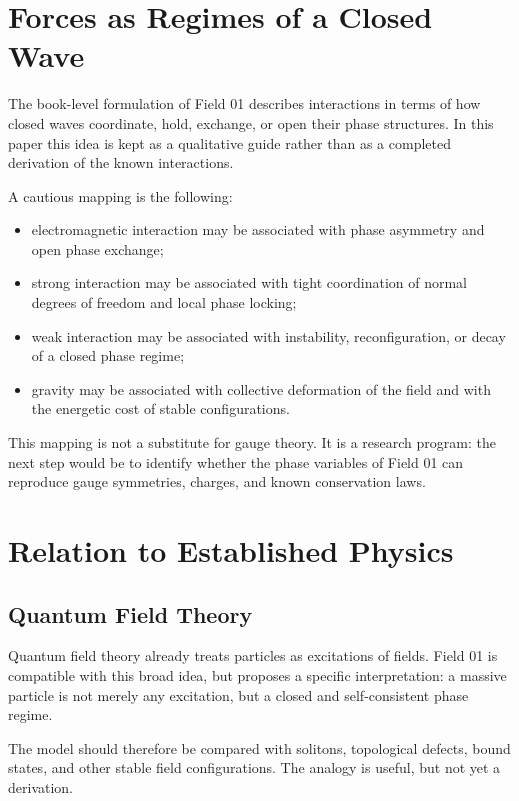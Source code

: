 \documentclass[11pt,a4paper]{article}
\begin{document}
\section{Forces as Regimes of a Closed Wave}

The book-level formulation of Field 01 describes interactions in terms of how closed waves coordinate, hold, exchange, or open their phase structures. In this paper this idea is kept as a qualitative guide rather than as a completed derivation of the known interactions.

A cautious mapping is the following:
\begin{itemize}
\item electromagnetic interaction may be associated with phase asymmetry and open phase exchange;
\item strong interaction may be associated with tight coordination of normal degrees of freedom and local phase locking;
\item weak interaction may be associated with instability, reconfiguration, or decay of a closed phase regime;
\item gravity may be associated with collective deformation of the field and with the energetic cost of stable configurations.
\end{itemize}

This mapping is not a substitute for gauge theory. It is a research program: the next step would be to identify whether the phase variables of Field 01 can reproduce gauge symmetries, charges, and known conservation laws.

\section{Relation to Established Physics}

\subsection*{Quantum Field Theory}

Quantum field theory already treats particles as excitations of fields. Field 01 is compatible with this broad idea, but proposes a specific interpretation: a massive particle is not merely any excitation, but a closed and self-consistent phase regime.

The model should therefore be compared with solitons, topological defects, bound states, and other stable field configurations. The analogy is useful, but not yet a derivation.
\end{document}
